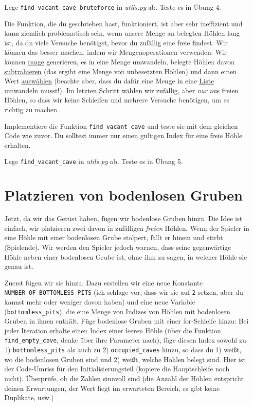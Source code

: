 \documentclass[
]{book}
\begin{document}
Lege \texttt{find\_vacant\_cave\_bruteforce} in \emph{utils.py} ab.
Teste es in Übung 4.

Die Funktion, die du geschrieben hast, funktioniert, ist aber sehr ineffizient und kann ziemlich problematisch sein, wenn unsere Menge an belegten Höhlen lang ist, da du viele Versuche benötigst, bevor du zufällig eine freie findest. Wir können das besser machen, indem wir Mengenoperationen verwenden: Wir können \href{https://docs.python.org/3/library/functions.html\#func-range}{range} generieren, es in eine Menge umwandeln, belegte Höhlen davon \href{https://docs.python.org/3/tutorial/datastructures.html\#sets}{subtrahieren} (das ergibt eine Menge von unbesetzten Höhlen) und dann einen Wert \href{https://docs.python.org/3/library/random.html\#random.choice}{auswählen} (beachte aber, dass du dafür eine Menge in eine \href{https://docs.python.org/3/library/stdtypes.html\#list}{Liste} umwandeln musst!). Im letzten Schritt wählen wir zufällig, aber \emph{nur} aus freien Höhlen, so dass wir keine Schleifen und mehrere Versuche benötigen, um es richtig zu machen.

Implementiere die Funktion \texttt{find\_vacant\_cave} und teste sie mit dem gleichen Code wie zuvor. Du solltest immer nur einen gültigen Index für eine freie Höhle erhalten.

Lege \texttt{find\_vacant\_cave} in \emph{utils.py} ab.
Teste es in Übung 5.

\hypertarget{platzieren-von-bodenlosen-gruben}{%
\section{Platzieren von bodenlosen Gruben}\label{platzieren-von-bodenlosen-gruben}}

Jetzt, da wir das Gerüst haben, fügen wir bodenlose Gruben hinzu. Die Idee ist einfach, wir platzieren zwei davon in zufälligen \emph{freien} Höhlen. Wenn der Spieler in eine Höhle mit einer bodenlosen Grube stolpert, fällt er hinein und stirbt (Spielende). Wir werden den Spieler jedoch warnen, dass seine gegenwärtige Höhle neben einer bodenlosen Grube ist, ohne ihm zu sagen, in welcher Höhle sie genau ist.

Zuerst fügen wir sie hinzu. Dazu erstellen wir eine neue Konstante \texttt{NUMBER\_OF\_BOTTOMLESS\_PITS} (ich schlage vor, dass wir sie auf \texttt{2} setzen, aber du kannst mehr oder weniger davon haben) und eine neue Variable (\texttt{bottomless\_pits}), die eine Menge von Indizes von Höhlen mit bodenlosen Gruben in ihnen enthält. Füge bodenlose Gruben mit einer for-Schleife hinzu: Bei jeder Iteration erhalte einen Index einer leeren Höhle (über die Funktion \texttt{find\_empty\_cave}, denke über ihre Parameter nach), füge diesen Index sowohl zu 1) \texttt{bottomless\_pits} als auch zu 2) \texttt{occupied\_caves} hinzu, so dass du 1) weißt, wo die bodenlosen Gruben sind und 2) weißt, welche Höhlen belegt sind. Hier ist der Code-Umriss für den Initialisierungsteil (kopiere die Hauptschleife noch nicht). Überprüfe, ob die Zahlen sinnvoll sind (die Anzahl der Höhlen entspricht deinen Erwartungen, der Wert liegt im erwarteten Bereich, es gibt keine Duplikate, usw.)
\end{document}

